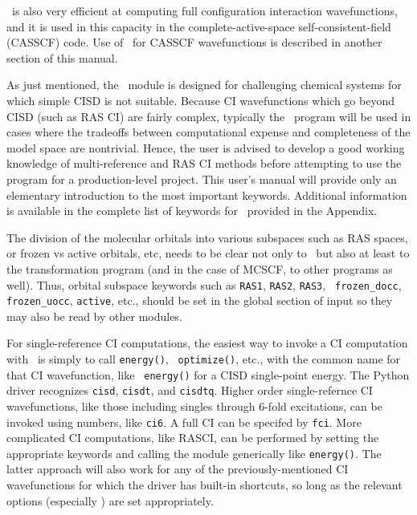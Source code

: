\PSIdetci\ is also very efficient at computing full configuration interaction
wavefunctions, and it is used in this capacity in the complete-active-space
self-consistent-field (CASSCF) code.  Use of \PSIdetci\ for CASSCF
wavefunctions is described in another section of this manual.

As just mentioned, the \PSIdetci\ module is designed for challenging 
chemical systems for which simple CISD is not suitable.  Because
CI wavefunctions which go beyond CISD (such as RAS CI) are fairly complex,
typically the \PSIdetci\ program will be used in cases where the 
tradeoffs between computational expense and completeness of the 
model space are nontrivial.  Hence, the user is advised to develop
a good working knowledge of multi-reference and RAS CI methods before
attempting to use the program for a production-level project.  This user's
manual will provide only an elementary introduction to the most
important keywords.  Additional information is available in the complete
list of keywords for \PSIdetci\ provided in the Appendix.

The division of the molecular orbitals into various subspaces such as
RAS spaces, or frozen vs active orbitals, etc, needs to be clear not
only to \PSIdetci\, but also at least to the transformation program
(and in the case of MCSCF, to other programs as well).  Thus, orbital
subspace keywords such as {\tt RAS1}, {\tt RAS2}, {\tt RAS3}, {\tt
frozen\_docc}, {\tt frozen\_uocc}, {\tt active}, etc., should be set
in the global section of input so they may also be read by other modules.

For single-reference CI computations, the easiest way to invoke a CI
computation with \PSIdetci\ is simply to call {\tt energy()}, {\tt
optimize()}, etc., with the common name for that CI wavefunction, like {\tt
energy(\qq)} for a CISD single-point energy.  The Python driver
recognizes {\tt cisd}, {\tt cisdt}, and {\tt cisdtq}.  Higher order
single-refernce CI wavefunctions, like those including singles through
6-fold excitations, can be invoked using numbers, like {\tt ci6}.  A full
CI can be specifed by {\tt fci}.  More complicated CI computations, like
RASCI, can be performed by setting the appropriate keywords and calling the
module generically like {\tt energy(\qq)}.  The latter approach
will also work for any of the previously-mentioned CI wavefunctions for
which the driver has built-in shortcuts, so long as the relevant options
(especially ) are set appropriately.


